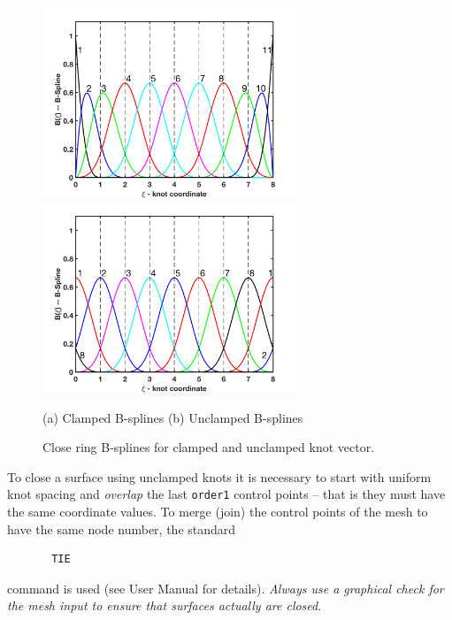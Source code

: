 \begin{figure}[!t]
\begin{center}

\centerline{
\includegraphics[width=3.00in]{figs/nurb3_1d_cl}
\includegraphics[width=3.00in]{figs/nurb3_1d_un}
}

\centerline{(a) Clamped B-splines \hspace{2in} (b) Unclamped B-splines}

\caption{Close ring B-splines for clamped and unclamped knot vector.  
\label{fig2b_s} }
\end{center}
\end{figure}

To close a surface using unclamped knots it is necessary to start with
uniform knot spacing and \textit{overlap} the last \texttt{order1} control
points -- that is they must have the same coordinate values.  To merge
(join) the control points of the mesh to have the same node number,
the standard
\begin{verbatim}
       TIE
\end{verbatim}
command is used (see User Manual for details).
\textit{Always use a graphical check for the mesh input to ensure that
surfaces actually are closed}.

